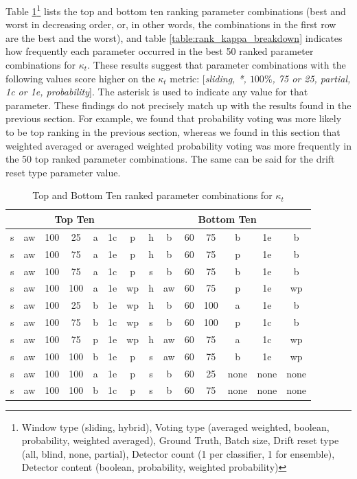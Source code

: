 Table \ref{table:rank_kappa_top_bottom_10}\footnote{Window type (sliding, hybrid), Voting type (averaged weighted, boolean, probability, weighted averaged), Ground Truth, Batch size, Drift reset type (all, blind, none, partial), Detector count (1 per classifier, 1 for ensemble), Detector content (boolean, probability, weighted probability)} lists the top and bottom ten ranking parameter combinations (best and worst in decreasing order, or, in other words, the combinations in the first row are the best and the worst), and table \ref{table:rank_kappa_breakdown} indicates how frequently each parameter occurred in the best 50 ranked parameter combinations for $\kappa_t$. These results suggest that parameter combinations with the following values score higher on the $\kappa_t$ metric: [\textit{sliding, *, $100\%$, 75 or 25, partial, 1c or 1e, probability}]. The asterisk is used to indicate any value for that parameter.
These findings do not precisely match up with the results found in the previous section. For example, we found that probability voting was more likely to be top ranking in the previous section, whereas we found in this section that weighted averaged or averaged weighted probability voting was more frequently in the 50 top ranked parameter combinations. The same can be said for the drift reset type parameter value.

\begin{table}[]
\centering
\caption{\label{table:rank_kappa_top_bottom_10}Top and Bottom Ten ranked parameter combinations for $\kappa_t$}
\begin{tabular}{|c|c|c|c|c|c|c||c|c|c|c|c|c|c|}
\hline
\multicolumn{7}{|c||}{\textbf{Top Ten}} & \multicolumn{7}{c|}{\textbf{Bottom Ten}} \\ \hline \hhline{=======#=======}
s & aw & 100 & 25 & a & 1c & p & h & b & 60 & 75 & b & 1e & b \\ \hline
s & aw & 100 & 75 & a & 1e & p & h & b & 60 & 75 & p & 1e & b \\ \hline
s & aw & 100 & 75 & a & 1c & p & s & b & 60 & 75 & b & 1e & b \\ \hline
s & aw & 100 & 100 & a & 1e & wp & h & aw & 60 & 75 & p & 1e & wp \\ \hline
s & aw & 100 & 25 & b & 1e & wp & h & b & 60 & 100 & a & 1e & b \\ \hline
s & aw & 100 & 75 & b & 1c & wp & s & b & 60 & 100 & p & 1c & b \\ \hline
s & aw & 100 & 75 & p & 1e & wp & h & aw & 60 & 75 & a & 1c & wp \\ \hline
s & aw & 100 & 100 & b & 1e & p & s & aw & 60 & 75 & b & 1e & wp \\ \hline
s & aw & 100 & 100 & a & 1e & p & s & b & 60 & 25 & none & none & none \\ \hline
s & aw & 100 & 100 & b & 1c & p & s & b & 60 & 75 & none & none & none \\ \hline
\end{tabular}
\end{table}

